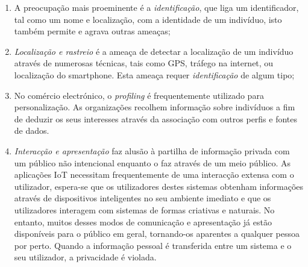 \documentclass[conference]{IEEEtran}
\begin{document}
\begin{enumerate}
    \item
    A preocupação mais proeminente é a \textit{identificação}, que liga
    um identificador, tal como um nome e localização, com a identidade de
    um indivíduo, isto também permite e agrava outras ameaças;

    \item
    \textit{Localização e rastreio} é a ameaça de detectar a localização
    de um indivíduo através de numerosas técnicas, tais como GPS, tráfego
    na internet, ou localização do smartphone. Esta ameaça requer \textit{identificação}
    de algum tipo;

    \item
    No comércio electrónico, o \textit{profiling} é frequentemente utilizado
    para personalização. As organizações recolhem informação sobre indivíduos
    a fim de deduzir os seus interesses através da associação com outros
    perfis e fontes de dados.

    \item
    \textit{Interacção e apresentação} faz alusão à partilha de informação
    privada com um público não intencional enquanto o faz através de um
    meio público. As aplicações IoT necessitam frequentemente de uma interacção
    extensa com o utilizador, espera-se que os utilizadores destes sistemas
    obtenham informações através de dispositivos inteligentes no seu ambiente
    imediato e que os utilizadores interagem com sistemas de formas criativas
    e naturais. No entanto, muitos desses modos de comunicação e apresentação
    já estão disponíveis para o público em geral, tornando-os aparentes
    a qualquer pessoa por perto. Quando a informação pessoal é transferida
    entre um sistema e o seu utilizador, a privacidade é violada.


\end{enumerate}
\end{document}
